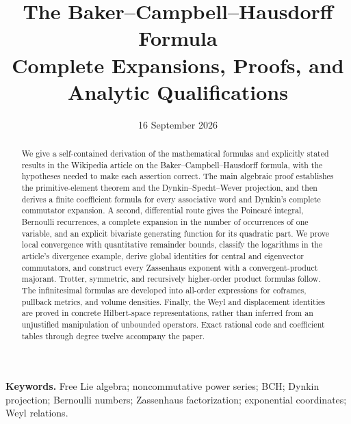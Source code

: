 \documentclass[11pt,letterpaper]{article}
\title{\textbf{The Baker--Campbell--Hausdorff Formula}\\[0.4em]
\large Complete Expansions, Proofs, and Analytic Qualifications}
\author{}
\date{16 September 2026}
\numberwithin{equation}{section}
\theoremstyle{definition}
\theoremstyle{remark}
\begin{document}
\maketitle
\begin{abstract}
We give a self-contained derivation of the mathematical formulas and explicitly stated results in the Wikipedia article on the Baker--Campbell--Hausdorff formula, with the hypotheses needed to make each assertion correct. The main algebraic proof establishes the primitive-element theorem and the Dynkin--Specht--Wever projection, and then derives a finite coefficient formula for every associative word and Dynkin's complete commutator expansion. A second, differential route gives the Poincar\'e integral, Bernoulli recurrences, a complete expansion in the number of occurrences of one variable, and an explicit bivariate generating function for its quadratic part. We prove local convergence with quantitative remainder bounds, classify the logarithms in the article's divergence example, derive global identities for central and eigenvector commutators, and construct every Zassenhaus exponent with a convergent-product majorant. Trotter, symmetric, and recursively higher-order product formulas follow. The infinitesimal formulas are developed into all-order expressions for coframes, pullback metrics, and volume densities. Finally, the Weyl and displacement identities are proved in concrete Hilbert-space representations, rather than inferred from an unjustified manipulation of unbounded operators. Exact rational code and coefficient tables through degree twelve accompany the paper.
\end{abstract}
\vspace{0.5em}
\noindent\textbf{Keywords.} Free Lie algebra; noncommutative power series; BCH; Dynkin projection; Bernoulli numbers; Zassenhaus factorization; exponential coordinates; Weyl relations.
\tableofcontents
\newpage












\appendix


\FloatBarrier


\end{document}
